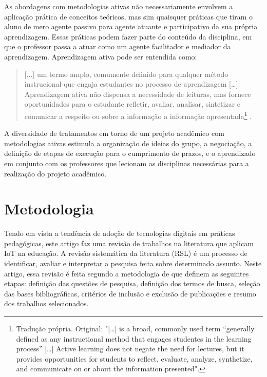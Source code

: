 \documentclass[portuguese]{textolivre}
\begin{document}
As abordagens com metodologias ativas não necessariamente envolvem a aplicação prática de conceitos teóricos, mas sim quaisquer práticas que tiram o aluno de mero agente passivo para agente atuante e participativo da sua própria aprendizagem. Essas práticas podem fazer parte do conteúdo da disciplina, em que o professor passa a atuar como um agente facilitador e mediador da aprendizagem. Aprendizagem ativa pode ser entendida como:

\begin{quote}
    [...] um termo amplo, comumente definido para qualquer método instrucional que engaja estudantes no processo de aprendizagem […] Aprendizagem ativa não dispensa a necessidade de leituras, mas fornece oportunidades para o estudante refletir, avaliar, analisar, sintetizar e comunicar a respeito ou sobre a informação a informação apresentada\footnote{Tradução própria. Original: "[…] is a broad, commonly used term “generally defined as any instructional method that engages studentes in the learning process” […] Active learning does not negate the need for lectures, but it provides opportunities for students to reflect, evaluate, analyze, synthetize, and communicate on or about the information presented".} \cite[p. 2]{crisol-moya_active_2020}.
\end{quote}

A diversidade de tratamentos em torno de um projeto acadêmico com metodologias ativas estimula a organização de ideias do grupo, a negociação, a definição de etapas de execução para o cumprimento de prazos, e o aprendizado em conjunto com os professores que lecionam as disciplinas necessárias para a realização do projeto acadêmico.

\section{Metodologia}\label{sec-conduta}
Tendo em vista a tendência de adoção de tecnologias digitais em práticas pedagógicas, este artigo faz uma revisão de trabalhos na literatura que aplicam IoT na educação. A revisão sistemática da literatura (RSL) é um processo de identificar, avaliar e interpretar a pesquisa feita sobre determinado assunto. Neste artigo, essa revisão é feita segundo a metodologia de \textcite{brereton_lessons_2007} que definem as seguintes etapas: definição das questões de pesquisa, definição dos termos de busca, seleção das bases bibliográficas, critérios de inclusão e exclusão de publicações e resumo dos trabalhos selecionados. 
\end{document}
